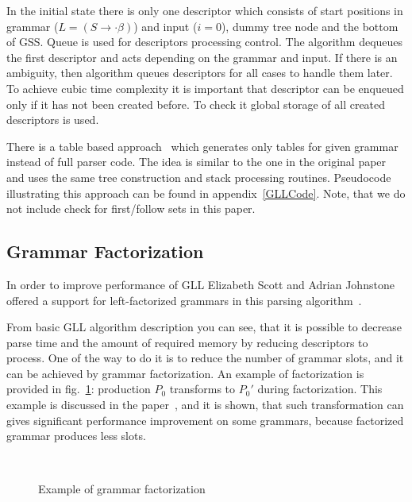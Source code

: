\documentclass[runningheads,a4paper]{llncs}
\begin{document}
In the initial state there is only one descriptor which consists of start positions in grammar ($L = (S \to \cdot \beta)$) and input ($i=0$), dummy tree node and the bottom of GSS.
Queue is used for descriptors processing control.
The algorithm dequeues the first descriptor and acts depending on the grammar and input.
If there is an ambiguity, then algorithm queues descriptors for all cases to handle them later. 
To achieve cubic time complexity it is important that descriptor can be enqueued only if it has not been created before.
To check it global storage of all created descriptors is used.

There is a table based approach~\cite{ragozina} which generates only tables for given grammar instead of full parser code.
The idea is similar to the one in the original paper and uses the same tree construction and stack processing routines.
Pseudocode illustrating this approach can be found in appendix~\ref{GLLCode}. Note, that we do not include check for first/follow sets in this paper.


\subsection{Grammar Factorization}%

In order to improve performance of GLL Elizabeth Scott and Adrian Johnstone offered a support for left-factorized grammars in this parsing algorithm~\cite{scott2016structuring}. 

From basic GLL algorithm description you can see, that it is possible to decrease parse time and the amount of required memory by reducing descriptors to process.
One of the way to do it is to reduce the number of grammar slots, and it can be achieved by grammar factorization.
An example of factorization is provided in fig.~\ref{fig:ExampleOfFactorization}: production $P_0$ transforms to $P_0'$ during factorization.
This example is discussed in the paper~\cite{scott2016structuring}, and it is shown, that such transformation can gives significant performance improvement on some grammars, because 
factorized grammar produces less slots.

\begin{figure}
    \centering
    ~
    \caption{Example of grammar factorization}
    \label{fig:ExampleOfFactorization}
\end{figure}
\end{document}
